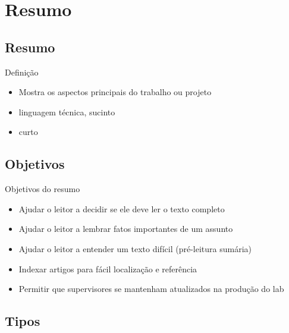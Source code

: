 \documentclass{beamer}
\begin{document}
\section{Resumo}

\subsection{Resumo}

\begin{frame}{Definição}
  \begin{itemize}
  \item Mostra os aspectos principais do trabalho ou projeto
  \item linguagem técnica, sucinto
  \item curto
  \end{itemize}
\end{frame}

\subsection{Objetivos}

\begin{frame}{Objetivos do resumo}
  \begin{itemize}
  \item Ajudar o leitor a decidir se ele deve ler o texto completo


  \item Ajudar o leitor a lembrar fatos importantes de um assunto


  \item Ajudar o leitor a entender um texto difícil (pré-leitura
    sumária)

  \item Indexar artigos para fácil localização e referência

  \item Permitir que supervisores se mantenham atualizados na produção
    do lab
  \end{itemize}
\end{frame}

\subsection{Tipos}
\end{document}
